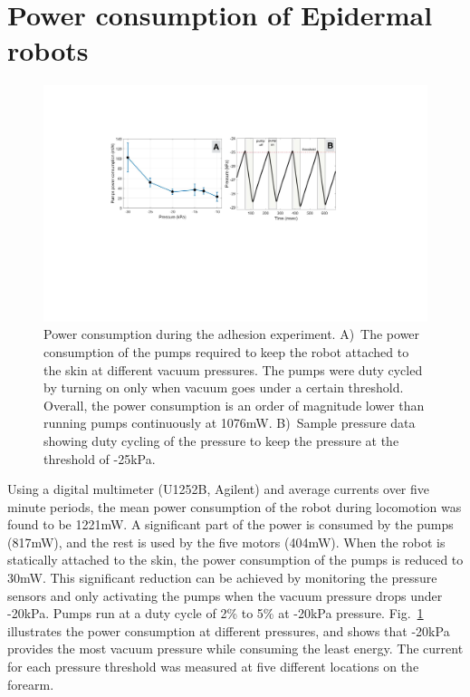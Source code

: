 \section{Power consumption of Epidermal robots}
\begin{figure}[!b]
\centering
\includegraphics[width=15.0cm]{pictures/chapter3/power_consumption.pdf}
\caption{Power consumption during the adhesion experiment. A)~The power consumption of the pumps required to keep the robot attached to the skin at different vacuum pressures. The pumps were duty cycled by turning on only when vacuum goes under a certain threshold. Overall, the power consumption is an order of magnitude lower than running pumps continuously at 1076mW. B)~Sample pressure data showing duty cycling of the pressure to keep the pressure at the threshold of -25kPa.}
\label{fig:power_consumption}
\end{figure}

Using a digital multimeter (U1252B, Agilent) and average currents over five minute periods, the mean power consumption of the robot during locomotion was found to be 1221mW. A significant part of the power is consumed by the pumps (817mW), and the rest is used by the five motors (404mW). When the robot is statically attached to the skin, the power consumption of the pumps is reduced to 30mW. This significant reduction can be achieved by monitoring the pressure sensors and only activating the pumps when the vacuum pressure drops under -20kPa. Pumps run at a duty cycle of 2\% to 5\% at -20kPa pressure. Fig.~\ref{fig:power_consumption} illustrates the power consumption at different pressures, and shows that -20kPa provides the most vacuum pressure while consuming the least energy. The current for each pressure threshold was measured at five different locations on the forearm. 

